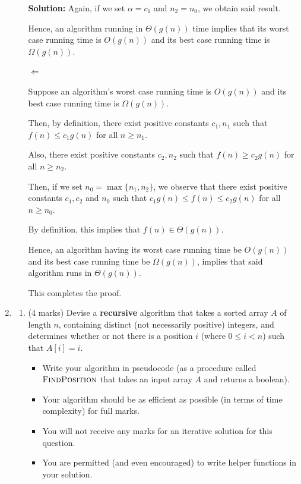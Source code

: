 \documentclass[a4,13pt]{extarticle}
\newenvironment{Solution}{\color{blue}\textbf{Solution:}}{}
\begin{document}
\begin{enumerate}
\begin{enumerate}
\begin{Solution}
Again, if we set $\alpha=c_1$ and $n_2=n_0$, we obtain said result.

Hence, an algorithm running in $\Theta(g(n))$ time implies that its worst case running time is $O(g(n))$ and its best case running time is $\Omega(g(n))$.

$\Leftarrow$

Suppose an algorithm's worst case running time is $O(g(n))$ and its best case running time is $\Omega(g(n))$.

Then, by definition, there exist positive constants $c_1, n_1$ such that $f(n)\le c_1g(n)$ for all $n\geq n_1$.

Also, there exist positive constants $c_2, n_2$ such that $f(n)\ge c_2g(n)$ for all $n\geq n_2$.

Then, if we set $n_0=\max\{n_1,n_2\}$, we observe that there exist positive constants $c_1, c_2$ and $n_0$ such that $c_1g(n)\le f(n)\le c_2g(n)$ for all $n\geq n_0$.

By definition, this implies that $f(n)\in\Theta(g(n))$.

Hence, an algorithm having its worst case running time be $O(g(n))$ and its best case running time be $\Omega(g(n))$, implies that said algorithm runs in $\Theta(g(n))$.

This completes the proof.
	      	\end{Solution}
	      	      	      	                  
	      \end{enumerate}
	      	          
	      \newpage 
	      	
	\item 
	      \begin{enumerate}
	      	\item (4 marks) Devise a \textbf{recursive} algorithm that takes a sorted array $A$ of length $n$, containing distinct (not necessarily positive) integers, and determines whether or not there is a position $i$ (where $0\leq i < n$) such that $A[i] = i$.
	      	      \begin{itemize}
	      	      	\item Write your algorithm in pseudocode (as a procedure called $\textsc{FindPosition}$ that takes an input array $A$ and returns a boolean).
	      	      	\item Your algorithm should be as efficient as possible (in terms of time complexity) for full marks.
	      	      	\item You will not receive any marks for an iterative solution for this question. 
	      	      	\item You are permitted (and even encouraged) to write helper functions in your solution.
	      	      \end{itemize}
	      	      

\end{enumerate}
\end{enumerate}
\end{document}

